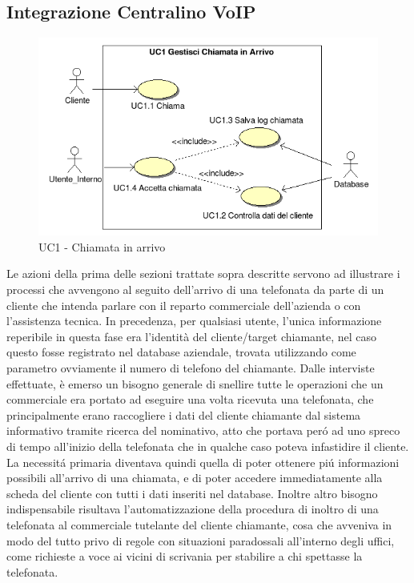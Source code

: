 \subsection{Integrazione Centralino VoIP}
\begin{figure}[!ht]
\centering
 \includegraphics[scale=0.8]{./images/UC1_chiamata.png}
\caption{UC1 - Chiamata in arrivo}
\end{figure}
Le azioni della prima delle sezioni trattate sopra descritte servono ad illustrare i processi che avvengono al seguito 
dell'arrivo di una telefonata da parte di un cliente che intenda parlare con il reparto commerciale dell'azienda o con 
l'assistenza tecnica. In precedenza, per qualsiasi utente, l'unica informazione reperibile in questa fase era l'identit\`a del cliente/target chiamante, nel caso questo
fosse registrato nel database aziendale, trovata utilizzando come parametro ovviamente il numero di telefono del chiamante.
Dalle interviste effettuate, \`e emerso un bisogno generale di snellire tutte le operazioni che un commerciale era portato
ad eseguire una volta ricevuta una telefonata, che principalmente erano raccogliere i dati del cliente chiamante dal sistema informativo
tramite ricerca del nominativo, atto che portava per\'o ad uno spreco di tempo all'inizio della telefonata che in qualche caso poteva
infastidire il cliente. La necessit\'a primaria diventava quindi quella di poter ottenere pi\'u informazioni possibili all'arrivo
di una chiamata, e di poter accedere immediatamente alla scheda del cliente con tutti i dati inseriti nel database. Inoltre 
altro bisogno indispensabile risultava l'automatizzazione della procedura di inoltro di una telefonata al commerciale tutelante
del cliente chiamante, cosa che avveniva in modo del tutto privo di regole con situazioni paradossali all'interno degli uffici, come 
richieste a voce ai vicini di scrivania per stabilire a chi spettasse la telefonata.
